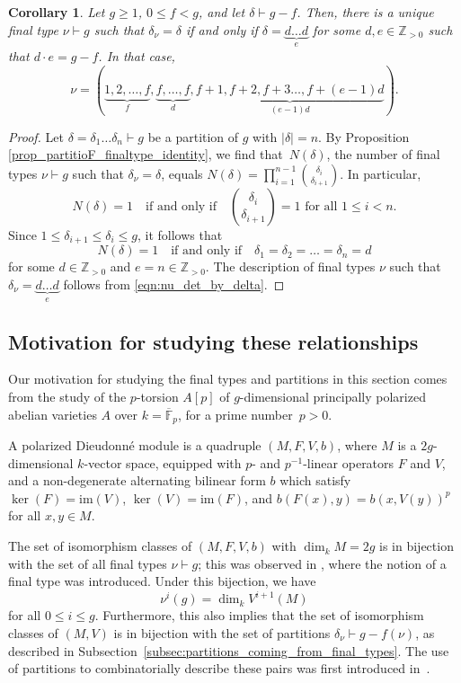 \documentclass[11pt]{amsart}
\numberwithin{equation}{section}
\theoremstyle{plain}
\newcommand{\Fbar}{\overline{\mathbb{F}}}
\newcommand{\Z}{\mathbb{Z}}
\newcommand{\im}{\mathrm{im}}
\newcommand{\<}{\left \langle}
\renewcommand{\>}{\right \rangle}
\newtheorem{cor}[thm]{Corollary}
\theoremstyle{definition}
\theoremstyle{remark}
\begin{document}
\begin{cor}
\label{cor:unique_nu_for_fixed_delta}
Let $g \geq 1$, $0 \leq f < g$, and let $\delta \vdash g - f$. Then, there is a unique final type $\nu \vdash g$ such that $\delta_{\nu} = \delta$ if and only if $\delta = \underbrace{d\ldots d}_e$ for some $d, e \in \Z_{> 0}$ such that $d\cdot e = g - f$. In that case, $$\nu = (\underbrace{1, 2, \ldots, f}_{f}, \underbrace{f, \ldots, f}_{d}, \underbrace{f + 1, f + 2, f + 3 \ldots, f + (e-1)d}_{(e - 1)d}). $$ 
\end{cor}

\begin{proof}
Let $\delta = \delta_1\ldots\delta_n \vdash g$ be a partition of $g$ with $|\delta| = n$. By Proposition \ref{prop_partitioF_finaltype_identity}, we find that~$N(\delta)$, the number of final types $\nu \vdash g$ such that $\delta_{\nu} = \delta$, equals $N(\delta) = \prod_{i = 1}^{n - 1}{\delta_i \choose \delta_{i + 1}}$. In particular, $$N(\delta) = 1\quad \text{if and only if}\quad {\delta_i \choose \delta_{i + 1}} = 1 \text{ for all } 1 \leq i < n.$$ Since $1 \leq \delta_{i + 1} \leq \delta_{i} \leq g$, it follows that $$N(\delta) = 1\quad \text{if and only if}\quad \delta_1 = \delta_2 = \ldots = \delta_n = d$$ for some $d \in \Z_{>0}$ and $e = n \in \Z_{>0}$. 
The description of final types $\nu$ such that $\delta_{\nu} = \underbrace{d \ldots d}_e$ follows from \eqref{eqn:nu_det_by_delta}. 
\end{proof}

\subsection{Motivation for studying these relationships} 
\label{subsec:motivation}
Our motivation for studying the final types and partitions in this section comes from the study of the $p$-torsion $A[p]$ of $g$-dimensional principally polarized abelian varieties $A$ over $k = \Fbar_p$, for a prime number~$p>0$. 

A polarized Dieudonn\'e module is a quadruple $(M, F, V, b)$, where $M$ is a $2g$-dimensional $k$-vector space, equipped with $p$- and $p^{-1}$-linear operators $F$ and $V$, and a non-degenerate alternating bilinear form $b$ which satisfy $\ker(F) = \im(V)$, $\ker(V) = \im(F)$, and $b(F(x), y) = b(x, V(y))^p$ for all $x, y \in M$. 

The set of isomorphism classes of $(M, F, V, b)$ with $\dim_k M = 2g$ is in bijection with the set of all final types $\nu \vdash g$; this was observed in \cite{oort}, where the notion of a final type was introduced. Under this bijection, we have $$\nu^i(g) = \dim_k V^{i+1}(M)$$ for all $0 \leq i \leq g$. Furthermore, this also implies that the set of isomorphism classes of $(M, V)$ is in bijection with the set of partitions $\delta_\nu \vdash g - f(\nu)$, as described in Subsection~\ref{subsec:partitions_coming_from_final_types}. The use of partitions to combinatorially describe these pairs was first introduced in~\cite{hassewitt}.
\end{document}
